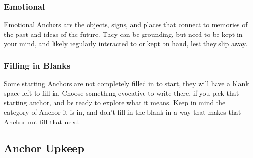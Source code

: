 \documentclass[
  oneside,
  statementpaper,
  9pt]{memoir}
\begin{document}
\hypertarget{emotional}{%
\subsubsection{Emotional}\label{emotional}}

\begin{Player}

Emotional Anchors are the objects, signs, and places that connect to memories of the past and ideas of the future. They can be grounding, but need to be kept in your mind, and likely regularly interacted to or kept on hand, lest they slip away.

\end{Player}

\hypertarget{filling-in-blanks}{%
\subsubsection{Filling in Blanks}\label{filling-in-blanks}}

\begin{Player}

Some starting Anchors are not completely filled in to start, they will have a blank space left to fill in. Choose something evocative to write there, if you pick that starting anchor, and be ready to explore what it means. Keep in mind the category of Anchor it is in, and don’t fill in the blank in a way that makes that Anchor not fill that need.

\end{Player}

\hypertarget{anchor-upkeep}{%
\subsection{Anchor Upkeep}\label{anchor-upkeep}}
\end{document}
